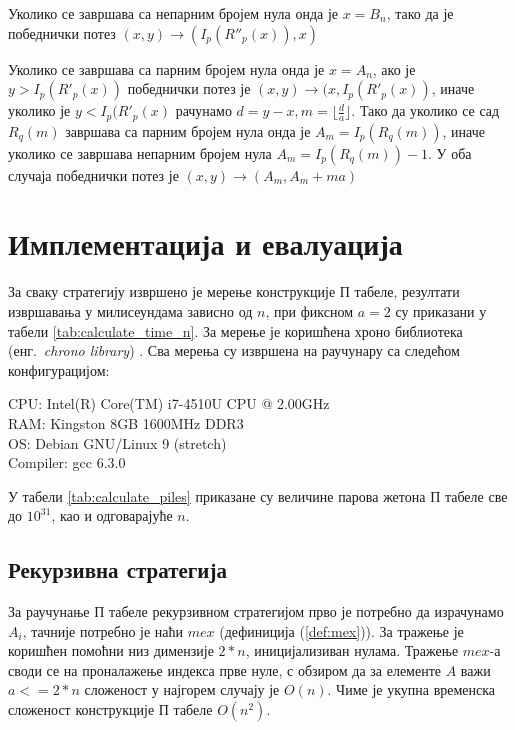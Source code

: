 \documentclass[a4paper]{article}
\begin{document}
Уколико се завршава са непарним бројем нула онда је $ x = B_{n} $, тако да је победнички потез $ (x, y) \rightarrow (I_{p}(R''_{p}(x)), x) $

Уколико се завршава са парним бројем нула онда је $ x = A_{n} $, ако је $ y > I_{p}(R'_{p}(x)) $ победнички потез је $ (x, y) \rightarrow (x, I_{p}(R'_{p}(x)) $, иначе уколико је $ y < I_{p}(R'_{p}(x) $ рачунамо $ d = y - x, m = \lfloor \frac{d}{a} \rfloor $. Тако да уколико се сад $ R_{q}(m) $ завршава са парним бројем нула онда је $ A_{m} = I_{p}(R_{q}(m)) $, иначе уколико се завршава непарним бројем нула $ A_{m} = I_{p}(R_{q}(m)) - 1 $. У оба случаја победнички потез је $ (x, y) \rightarrow (A_{m}, A_{m} + ma) $

\section{Имплементација и евалуација}
\label{implementacija_evaluacija}

За сваку стратегију извршено је мерење конструкције П табеле, резултати извршавања у милисеундама зависно од $ n $, при фиксном $ a = 2 $ су приказани у табели \ref{tab:calculate_time_n}. 
За мерење је коришћена хроно библиотека (енг.{~\em chrono library}) \cite{chrono_library}. Сва мерења су извршена на раучунару са следећом конфигурацијом:
\begin{flushleft}
	CPU: Intel(R) Core(TM) i7-4510U CPU @ 2.00GHz\\
	RAM: Kingston 8GB 1600MHz DDR3\\
	OS: Debian GNU/Linux 9 (stretch)\\
	Compiler: gcc 6.3.0\\
\end{flushleft}

У табели \ref{tab:calculate_piles} приказане су величине парова жетона П табеле све до $ 10^{31} $, као и одговарајуће $ n $.

\subsection{Рекурзивна стратегија}

За раучунање П табеле рекурзивном стратегијом прво је потребно да израчунамо $ A_{i} $, тачније потребно је наћи $ mex $ (дефиниција (\ref{def:mex})). За тражење је коришћен помоћни низ димензије $ 2*n $, иницијализиван нулама. Тражење $ mex $-а  своди се на проналажење индекса прве нуле, с обзиром да за елементе $ A $ важи $ a <= 2*n $ сложеност у најгорем случају је $ O(n) $. Чиме је укупна временска сложеност конструкције П табеле $ O(n^2) $.\\
\end{document}
